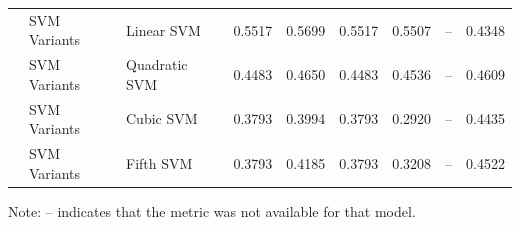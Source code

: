 \documentclass[10pt]{article}
\begin{document}
\begin{table}[ht!]
{\begin{tabular}{@{} l l l *{4}{S[table-format=1.4]} S[table-format=1.4] S[table-format=1.4] @{}}
                                       \cmidrule(lr){2-9}
                                       & SVM Variants & Linear SVM & 0.5517 & 0.5699 & 0.5517 & 0.5507 & {--} & 0.4348 \\
                                       & SVM Variants & Quadratic SVM & 0.4483 & 0.4650 & 0.4483 & 0.4536 & {--} & 0.4609 \\
                                       & SVM Variants & Cubic SVM & 0.3793 & 0.3994 & 0.3793 & 0.2920 & {--} & 0.4435 \\
                                       & SVM Variants & Fifth SVM & 0.3793 & 0.4185 & 0.3793 & 0.3208 & {--} & 0.4522 \\
                                       \bottomrule
      \end{tabular}
    }

    \vspace{0.2cm}
    \small
    Note: -- indicates that the metric was not available for that model.
  \end{table}
\end{document}
